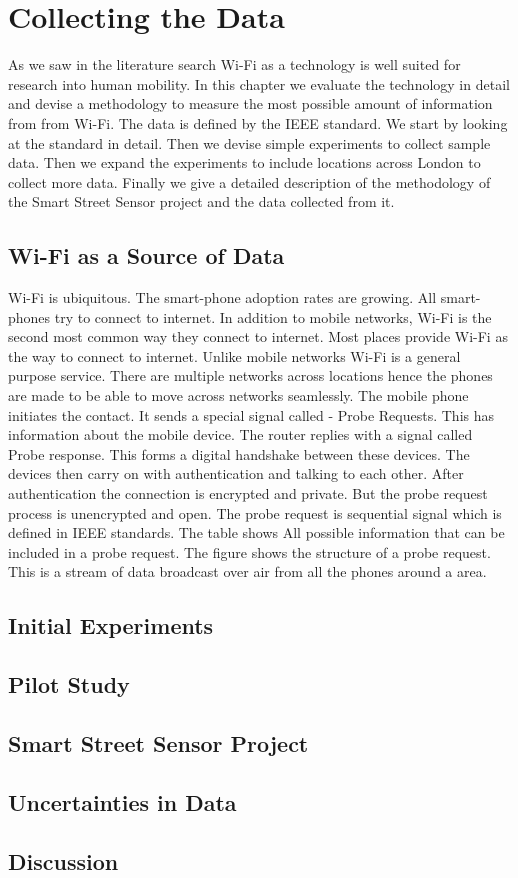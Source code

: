 \chapter{Collecting the Data}

As we saw in the literature search Wi-Fi as a technology is well suited for research into human mobility.
In this chapter we evaluate the technology in detail and devise a methodology to
measure the most possible amount of information from from Wi-Fi.
The data is defined by the IEEE standard.
We start by looking at the standard in detail.
Then we devise simple experiments to collect sample data.
Then we expand the experiments to include locations across London to collect more data.
Finally we give a detailed description of the methodology of the Smart Street Sensor project and the data collected from it.

\section{Wi-Fi as a Source of Data}

Wi-Fi is ubiquitous.
The smart-phone adoption rates are growing.
All smart-phones try to connect to internet.
In addition to mobile networks, Wi-Fi is the second most common way they connect to internet.
Most places provide Wi-Fi as the way to connect to internet.
Unlike mobile networks Wi-Fi is a general purpose service.
There are multiple networks across locations hence the phones are made to be able to move across networks seamlessly.
The mobile phone initiates the contact.
It sends a special signal called - Probe Requests.
This has information about the mobile device.
The router replies with a signal called Probe response.
This forms a digital handshake between these devices.
The devices then carry on with authentication and talking to each other.
After authentication the connection is encrypted and private.
But the probe request process is unencrypted and open.
The probe request is sequential signal which is defined in IEEE standards.
The table shows All possible information that can be included in a probe request.
The figure shows the structure of a probe request.
This is a stream of data broadcast over air from all the phones around a area. 


\section{Initial Experiments}

\section{Pilot Study}

\section{Smart Street Sensor Project}

\section{Uncertainties in Data}

\section{Discussion}
